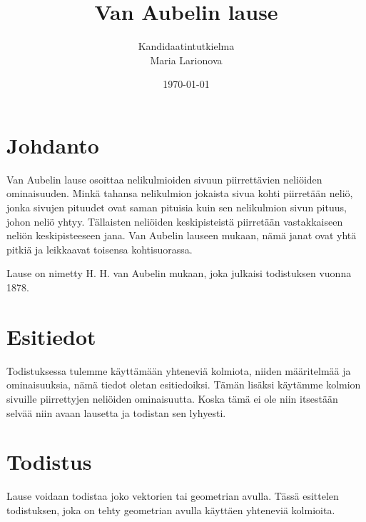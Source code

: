 \documentclass{article}
\title{Van Aubelin lause}
\author{Kandidaatintutkielma\\Maria Larionova}
\date{\today}
\begin{document}
\maketitle
\pagebreak
\tableofcontents
\pagebreak

\section{Johdanto}
Van Aubelin lause osoittaa nelikulmioiden sivuun piirrettävien neliöiden ominaisuuden. Minkä tahansa nelikulmion jokaista sivua kohti piirretään neliö, jonka sivujen pituudet ovat saman pituisia kuin sen nelikulmion sivun pituus, johon neliö yhtyy. Tällaisten neliöiden keskipisteistä piirretään vastakkaiseen neliön keskipisteeseen jana. Van Aubelin lauseen mukaan, nämä janat ovat yhtä pitkiä ja leikkaavat toisensa kohtisuorassa. 

Lause on nimetty H. H. van Aubelin mukaan, joka julkaisi todistuksen vuonna 1878.

\pagebreak
\section{Esitiedot}
Todistuksessa tulemme käyttämään yhteneviä kolmiota, niiden määritelmää ja ominaisuuksia, nämä tiedot oletan esitiedoiksi. Tämän lisäksi käytämme kolmion sivuille piirrettyjen neliöiden ominaisuutta. Koska tämä ei ole niin itsestään selvää niin avaan lausetta ja todistan sen lyhyesti.

\pagebreak
\section{Todistus}
Lause voidaan todistaa joko vektorien tai geometrian avulla. Tässä esittelen todistuksen, joka on tehty geometrian avulla käyttäen yhteneviä kolmioita.
\end{document}
